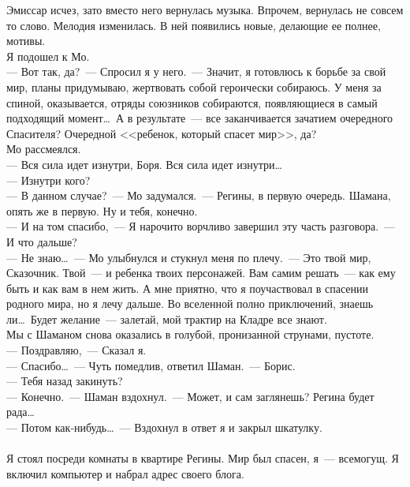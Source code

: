 Эмиссар исчез, зато вместо него вернулась музыка. Впрочем, вернулась не совсем 
то слово. Мелодия изменилась. В ней появились новые, делающие ее полнее, 
мотивы. \\
Я подошел к Мо.\\
--- Вот так, да?~--- Спросил я у него.~--- Значит, я готовлюсь к борьбе за свой 
мир, планы придумываю, жертвовать собой героически собираюсь. У меня за спиной, 
оказывается, отряды союзников собираются, появляющиеся в самый подходящий 
момент\ldots\ А в результате~--- все заканчивается зачатием очередного 
Спасителя? Очередной <<ребенок, который спасет мир>>, да?\\
Мо рассмеялся.\\
--- Вся сила идет изнутри, Боря. Вся сила идет изнутри\ldots\\
--- Изнутри кого?\\
--- В данном случае?~--- Мо задумался.~--- Регины, в первую очередь. Шамана, 
опять же в первую. Ну и тебя, конечно.\\
--- И на том спасибо,~--- Я нарочито ворчливо завершил эту часть разговора.~--- И 
что дальше?\\
--- Не знаю\ldots~--- Мо улыбнулся и стукнул меня по плечу.~--- Это твой мир, 
Сказочник. Твой~--- и ребенка твоих персонажей. Вам самим решать~--- как ему быть и как 
вам в нем жить. А мне приятно, что я поучаствовал в спасении родного мира, но я лечу 
дальше. Во вселенной полно приключений, знаешь ли\ldots\ Будет желание~--- 
залетай, мой трактир на Кладре все знают.\\
Мы с Шаманом снова оказались в голубой, пронизанной струнами, пустоте.\\
--- Поздравляю,~--- Сказал я.\\
--- Спасибо\ldots~--- Чуть помедлив, ответил Шаман.~--- Борис.\\
--- Тебя назад закинуть?\\
--- Конечно.~--- Шаман вздохнул.~--- Может, и сам заглянешь? Регина будет 
рада\ldots\\
--- Потом как-нибудь\ldots~--- Вздохнул в ответ я и закрыл шкатулку.\\
~\\
Я стоял посреди комнаты в квартире Регины. Мир был спасен, я~--- всемогущ. Я 
включил компьютер и набрал адрес своего блога.

\newpage


